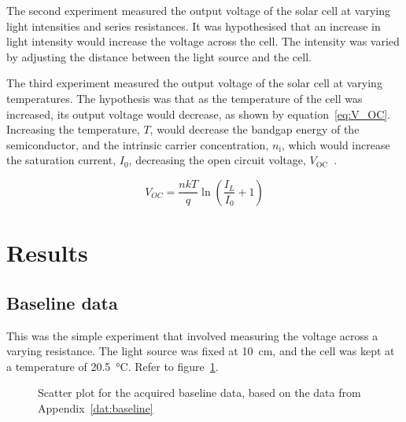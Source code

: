 \documentclass[a4paper,11pt]{article}
\begin{document}
The second experiment measured the output voltage of the solar cell at varying light intensities and series resistances. It was hypothesised that an increase in light intensity would increase the voltage across the cell. The intensity was varied by adjusting the distance between the light source and the cell.

The third experiment measured the output voltage of the solar cell at varying temperatures. The hypothesis was that as the temperature of the cell was increased, its output voltage would decrease, as shown by equation~\ref{eq:V_OC}. Increasing the temperature, $T$, would decrease the bandgap energy of the semiconductor, and the intrinsic carrier concentration, $n_{\textrm{i}}$, which would increase the saturation current, $I_0$, decreasing the open circuit voltage, $V_{\textrm{OC}}$~\cite{pveTemperature}.

\begin{equation} \label{eq:V_OC}
V_{OC} = \frac{nkT}{q}\ln{\left(\frac{I_L}{I_0} + 1\right)}
\end{equation}


\section{Results}
\subsection{Baseline data}

This was the simple experiment that involved measuring the voltage across a varying resistance. The light source was fixed at \SI{10}{\centi\metre}, and the cell was kept at a temperature of \SI{20.5}{\celsius}. Refer to figure~\ref{plot:baseline}.

\begin{figure}[h]
\centering
{}
\caption{Scatter plot for the acquired baseline data, based on the data from Appendix~\ref{dat:baseline}}
\label{plot:baseline}
\end{figure}
\end{document}
